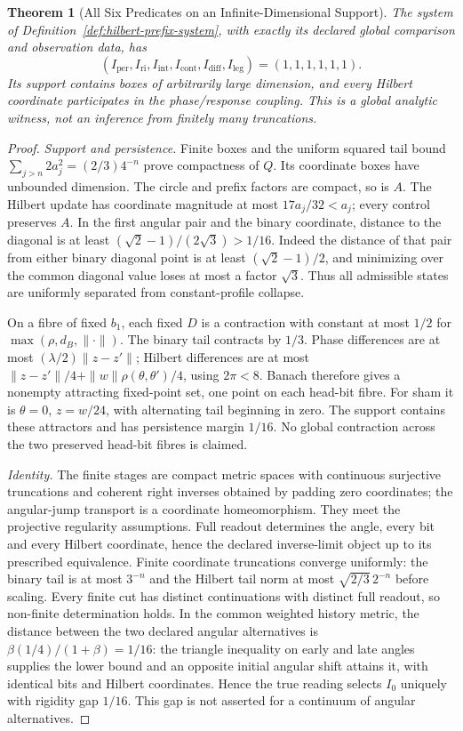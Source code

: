 \documentclass[11pt,a4paper]{article}
\newtheorem{theorem}{Theorem}[section]
\theoremstyle{definition}
\newcommand{\Iper}{I_{\mathrm{per}}}
\newcommand{\Iri}{I_{\mathrm{ri}}}
\newcommand{\Iint}{I_{\mathrm{int}}}
\newcommand{\Icont}{I_{\mathrm{cont}}}
\newcommand{\Idiff}{I_{\mathrm{diff}}}
\newcommand{\Ileg}{I_{\mathrm{leg}}}
\begin{document}
\begin{theorem}[All Six Predicates on an Infinite-Dimensional Support]\label{thm:infinite-six-predicate-witness}
The system of Definition~\ref{def:hilbert-prefix-system}, with exactly its declared global comparison and observation data, has
\[
 (\Iper,\allowbreak \Iri,\allowbreak \Iint,\allowbreak \Icont,\allowbreak \Idiff,\allowbreak \Ileg)=(1,1,1,1,1,1).
\]
Its support contains boxes of arbitrarily large dimension, and every Hilbert coordinate participates in the phase/response coupling. This is a global analytic witness, not an inference from finitely many truncations.
\end{theorem}
\begin{proof}
\emph{Support and persistence.} Finite boxes and the uniform squared tail bound $\sum_{j>n}2a_j^2=(2/3)4^{-n}$ prove compactness of $Q$. Its coordinate boxes have unbounded dimension. The circle and prefix factors are compact, so is $A$. The Hilbert update has coordinate magnitude at most $17a_j/32<a_j$; every control preserves $A$. In the first angular pair and the binary coordinate, distance to the diagonal is at least $(\sqrt2-1)/(2\sqrt3)>1/16$. Indeed the distance of that pair from either binary diagonal point is at least $(\sqrt2-1)/2$, and minimizing over the common diagonal value loses at most a factor $\sqrt3$. Thus all admissible states are uniformly separated from constant-profile collapse.

On a fibre of fixed $b_1$, each fixed $D$ is a contraction with constant at most $1/2$ for $\max(\rho,d_B,\|\cdot\|)$. The binary tail contracts by $1/3$. Phase differences are at most $(\lambda/2)\|z-z'\|$; Hilbert differences are at most $\|z-z'\|/4+\|w\|\rho(\theta,\theta')/4$, using $2\pi<8$. Banach therefore gives a nonempty attracting fixed-point set, one point on each head-bit fibre. For sham it is $\theta=0$, $z=w/24$, with alternating tail beginning in zero. The support contains these attractors and has persistence margin $1/16$. No global contraction across the two preserved head-bit fibres is claimed.

\emph{Identity.} The finite stages are compact metric spaces with continuous surjective truncations and coherent right inverses obtained by padding zero coordinates; the angular-jump transport is a coordinate homeomorphism. They meet the projective regularity assumptions. Full readout determines the angle, every bit and every Hilbert coordinate, hence the declared inverse-limit object up to its prescribed equivalence. Finite coordinate truncations converge uniformly: the binary tail is at most $3^{-n}$ and the Hilbert tail norm at most $\sqrt{2/3}\,2^{-n}$ before scaling. Every finite cut has distinct continuations with distinct full readout, so non-finite determination holds. In the common weighted history metric, the distance between the two declared angular alternatives is $\beta(1/4)/(1+\beta)=1/16$: the triangle inequality on early and late angles supplies the lower bound and an opposite initial angular shift attains it, with identical bits and Hilbert coordinates. Hence the true reading selects $I_0$ uniquely with rigidity gap $1/16$. This gap is not asserted for a continuum of angular alternatives.


\end{proof}
\end{document}
